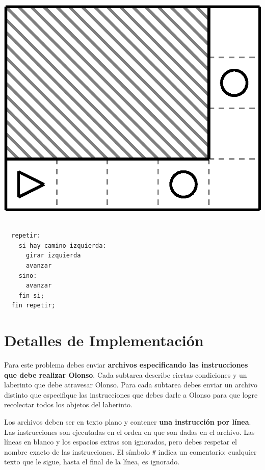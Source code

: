 \documentclass{oci}
\def\bgcolor{\par\setbox0\vbox\bgroup}
\def\endbgcolor{\egroup\fboxsep0pt \noindent\colorbox[gray]{0.95}{\usebox0}\par}
\begin{document}
\begin{problemDescription}
\begin{minipage}{0.5\linewidth}
  \centering
  \includegraphics[scale=0.45]{laberintos/ejemplo3.eps}
\end{minipage}
\begin{minipage}{0.5\linewidth}
  \centering
  \bgcolor{}
\begin{verbatim}

  repetir:
    si hay camino izquierda:
      girar izquierda
      avanzar
    sino:
      avanzar
    fin si;
  fin repetir;
\end{verbatim}
  \endbgcolor{}
\end{minipage}

\end{problemDescription}

\section*{Detalles de Implementación}
Para este problema debes enviar {\bf archivos especificando las instrucciones que debe realizar Olonso}.
Cada subtarea describe ciertas condiciones y un laberinto que debe atravesar Olonso.
Para cada subtarea debes enviar un archivo distinto que especifique las instrucciones que debes darle a Olonso para que logre recolectar todos los objetos del laberinto.

Los archivos deben ser en texto plano y contener {\bf una instrucción por línea}.
Las instrucciones son ejecutadas en el orden en que son dadas en el archivo.
Las líneas en blanco y los espacios extras son ignorados, pero debes respetar el nombre exacto de las instrucciones.
El símbolo \verb~#~ indica un comentario; cualquier texto que le sigue, hasta el final de la línea, es ignorado.
\end{document}
